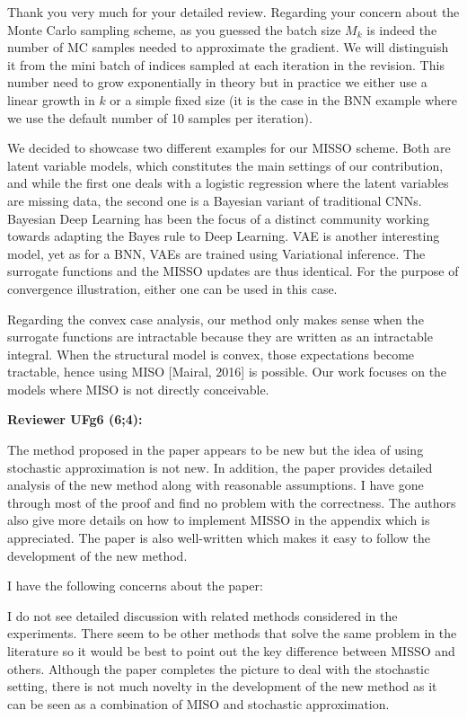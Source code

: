 \documentclass{article}
\begin{document}
Thank you very much for your detailed review.
Regarding your concern about the Monte Carlo sampling scheme, as you guessed the batch size $M_k$ is indeed the number of MC samples needed to approximate the gradient. We will distinguish it from the mini batch of indices sampled at each iteration in the revision. This number need to grow exponentially in theory but in practice we either use a linear growth in $k$ or a simple fixed size (it is the case in the BNN example where we use the default number of 10 samples per iteration).

We decided to showcase two different examples for our MISSO scheme. Both are latent variable models, which constitutes the main settings of our contribution, and while the first one deals with a logistic regression where the latent variables are missing data, the second one is a Bayesian variant of traditional CNNs. Bayesian Deep Learning has been the focus of a distinct community working towards adapting the Bayes rule to Deep Learning. VAE is another interesting model, yet as for a BNN, VAEs are trained using Variational inference. The surrogate functions and the MISSO updates are thus identical. For the purpose of convergence illustration, either one can be used in this case.

Regarding the convex case analysis, our method only makes sense when the surrogate functions are intractable because they are written as an intractable integral. When the structural model is convex, those expectations become tractable, hence using MISO [Mairal, 2016] is possible. 
Our work focuses on the models where MISO is not directly conceivable.

\textbf{Reviewer UFg6 (6;4):}

The method proposed in the paper appears to be new but the idea of using stochastic approximation is not new. In addition, the paper provides detailed analysis of the new method along with reasonable assumptions. I have gone through most of the proof and find no problem with the correctness. The authors also give more details on how to implement MISSO in the appendix which is appreciated. The paper is also well-written which makes it easy to follow the development of the new method.

I have the following concerns about the paper:

I do not see detailed discussion with related methods considered in the experiments. There seem to be other methods that solve the same problem in the literature so it would be best to point out the key difference between MISSO and others.
Although the paper completes the picture to deal with the stochastic setting, there is not much novelty in the development of the new method as it can be seen as a combination of MISO and stochastic approximation.
\end{document}
